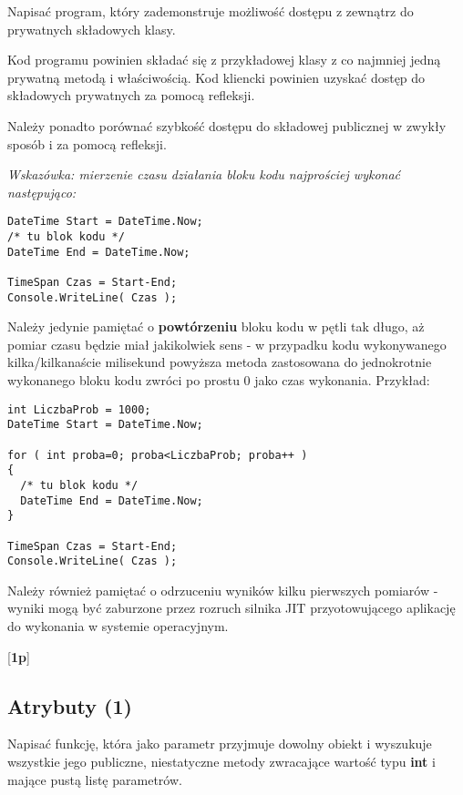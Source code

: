       Napisać program, który zademonstruje możliwość dostępu z zewnątrz
\label{refleksja}	  
      do prywatnych składowych klasy.
      
      Kod programu powinien składać się z przykładowej klasy z co najmniej
      jedną prywatną metodą i właściwością. Kod kliencki powinien uzyskać dostęp
      do składowych prywatnych za pomocą refleksji.
      
      Należy ponadto porównać szybkość dostępu do składowej
      publicznej w zwykły sposób i za pomocą refleksji.
      
      {\em Wskazówka: mierzenie czasu działania bloku kodu najprościej wykonać następująco:
      
      \begin{verbatim}
DateTime Start = DateTime.Now;
/* tu blok kodu */
DateTime End = DateTime.Now;

TimeSpan Czas = Start-End;
Console.WriteLine( Czas );
      \end{verbatim}
      
      Należy jedynie pamiętać o {\bf powtórzeniu} bloku kodu w pętli tak długo, aż pomiar czasu będzie miał jakikolwiek sens - w przypadku kodu wykonywanego
      kilka/kilkanaście milisekund powyższa metoda zastosowana do jednokrotnie wykonanego bloku kodu zwróci po prostu 0 jako czas wykonania. Przykład:

      \begin{verbatim}
int LiczbaProb = 1000;      
DateTime Start = DateTime.Now;

for ( int proba=0; proba<LiczbaProb; proba++ )
{
  /* tu blok kodu */
  DateTime End = DateTime.Now;
}

TimeSpan Czas = Start-End;
Console.WriteLine( Czas );
      \end{verbatim}}

Należy również pamiętać o odrzuceniu wyników kilku pierwszych pomiarów - wyniki mogą być zaburzone przez rozruch silnika JIT przyotowującego aplikację do wykonania w systemie operacyjnym.	  
	  
      [{\bf 1p}]

\subsection{Atrybuty (1)}

	Napisać funkcję, która jako parametr przyjmuje dowolny obiekt i wyszukuje wszystkie jego publiczne, niestatyczne metody zwracające
\label{atrybuty}	
    wartość typu {\bf int} i mające pustą listę parametrów.	
	
